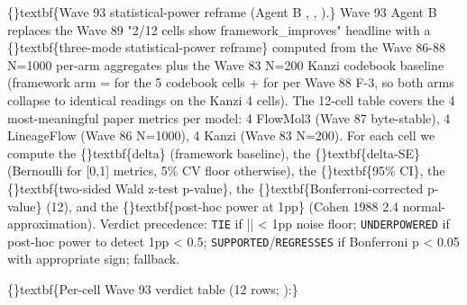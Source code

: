 \documentclass{article}
\begin{document}
\sloppy \{\}textbf\{Wave 93 statistical-power reframe (Agent B  , , ).\} Wave 93 Agent B replaces the Wave 89 "2/12 cells show framework\_improves" headline with a \{\}textbf\{three-mode statistical-power reframe\} computed from the Wave 86-88 N=1000 per-arm aggregates plus the Wave 83 N=200 Kanzi codebook baseline (framework arm =  for the 5 codebook cells +  for  per Wave 88 F-3, so both arms collapse to identical readings on the Kanzi 4 cells). The 12-cell table covers the 4 most-meaningful paper metrics per model: 4 FlowMol3 (Wave 87 byte-stable), 4 LineageFlow (Wave 86 N=1000), 4 Kanzi (Wave 83 N=200). For each cell we compute the \{\}textbf\{delta\} (framework  baseline), the \{\}textbf\{delta-SE\} (Bernoulli for [0,1] metrics, 5\% CV floor otherwise), the \{\}textbf\{95\% CI\}, the \{\}textbf\{two-sided Wald z-test p-value\}, the \{\}textbf\{Bonferroni-corrected p-value\} (12), and the \{\}textbf\{post-hoc power at 1pp\} (Cohen 1988 2.4 normal-approximation). Verdict precedence: \texttt{TIE} if || < 1pp noise floor; \texttt{UNDERPOWERED} if post-hoc power to detect 1pp < 0.5; \texttt{SUPPORTED}/\texttt{REGRESSES} if Bonferroni p < 0.05 with appropriate  sign;  fallback.

\sloppy \{\}textbf\{Per-cell Wave 93 verdict table (12 rows; ):\}
\end{document}
